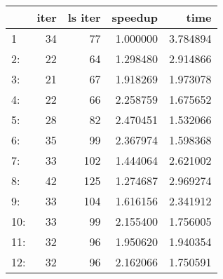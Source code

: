 \begin{tabular}{lrrrr}
\toprule
{} &  iter &  ls iter &   speedup &      time \\
\midrule
1   &    34 &       77 &  1.000000 &  3.784894 \\
2:  &    22 &       64 &  1.298480 &  2.914866 \\
3:  &    21 &       67 &  1.918269 &  1.973078 \\
4:  &    22 &       66 &  2.258759 &  1.675652 \\
5:  &    28 &       82 &  2.470451 &  1.532066 \\
6:  &    35 &       99 &  2.367974 &  1.598368 \\
7:  &    33 &      102 &  1.444064 &  2.621002 \\
8:  &    42 &      125 &  1.274687 &  2.969274 \\
9:  &    33 &      104 &  1.616156 &  2.341912 \\
10: &    33 &       99 &  2.155400 &  1.756005 \\
11: &    32 &       96 &  1.950620 &  1.940354 \\
12: &    32 &       96 &  2.162066 &  1.750591 \\
\bottomrule
\end{tabular}
